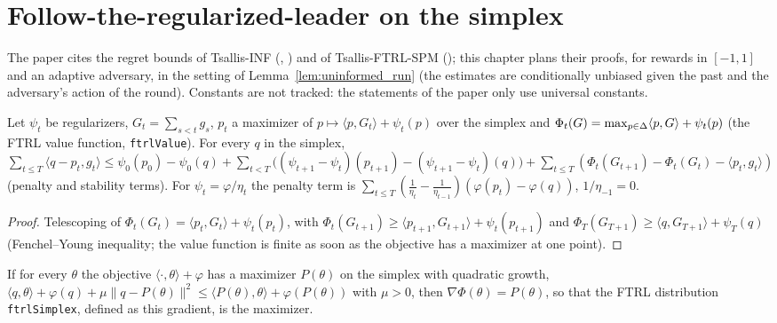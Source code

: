 \chapter{Follow-the-regularized-leader on the simplex}
\label{chap:prereq_ftrl}

The paper cites the regret bounds of Tsallis-INF (\cite{zimmert2021tsallisinf},
\cite{ito2025instancedependent}) and of Tsallis-FTRL-SPM (\cite{ito2024adaptive}); this chapter
plans their proofs, for rewards in $[-1, 1]$ and an adaptive adversary, in the setting of
Lemma~\ref{lem:uninformed_run} (the estimates are conditionally unbiased given the past and the
adversary's action of the round). Constants are not tracked: the statements of the paper only use
universal constants.

\begin{lemma}
  \label{lem:ftrl_decomposition}
  \leanok
  Let $\psi_t$ be regularizers, $G_t = \sum_{s < t} g_s$, $p_t$ a maximizer of $p \mapsto \langle
  p, G_t\rangle + \psi_t(p)$ over the simplex and $\Phi_t(G) = \max_{p \in \Delta} \langle p,
  G\rangle + \psi_t(p)$ (the FTRL value function, \texttt{ftrlValue}). For every $q$ in the
  simplex,
  $\sum_{t \le T} \langle q - p_t, g_t\rangle \le \psi_0(p_0) - \psi_0(q) + \sum_{t < T}
  \bigl((\psi_{t+1} - \psi_t)(p_{t+1}) - (\psi_{t+1} - \psi_t)(q)\bigr) + \sum_{t \le T}
  (\Phi_t(G_{t+1}) - \Phi_t(G_t) - \langle p_t, g_t\rangle)$ (penalty and stability terms). For
  $\psi_t = \varphi/\eta_t$ the penalty term is $\sum_{t \le T}(\frac{1}{\eta_t} -
  \frac{1}{\eta_{t-1}}) (\varphi(p_t) - \varphi(q))$, $1/\eta_{-1} = 0$.
\end{lemma}

\begin{proof}
  \leanok
  Telescoping of $\Phi_t(G_t) = \langle p_t, G_t\rangle + \psi_t(p_t)$, with $\Phi_t(G_{t+1}) \ge
  \langle p_{t+1}, G_{t+1}\rangle + \psi_t(p_{t+1})$ and $\Phi_T(G_{T+1}) \ge \langle q,
  G_{T+1}\rangle + \psi_T(q)$ (Fenchel--Young inequality; the value function is finite as soon as
  the objective has a maximizer at one point).
\end{proof}

\begin{lemma}
  \label{lem:ftrl_gradient}
  \leanok
  If for every $\theta$ the objective $\langle \cdot, \theta\rangle + \varphi$ has a maximizer
  $P(\theta)$ on the simplex with quadratic growth, $\langle q, \theta\rangle + \varphi(q) + \mu
  \|q - P(\theta)\|^2 \le \langle P(\theta), \theta\rangle + \varphi(P(\theta))$ with $\mu > 0$,
  then $\nabla \Phi(\theta) = P(\theta)$, so that the FTRL distribution \texttt{ftrlSimplex},
  defined as this gradient, is the maximizer.
\end{lemma}

